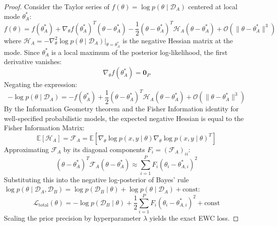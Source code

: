 \documentclass[11pt,a4paper]{article}
\theoremstyle{definition}
\begin{document}
\begin{proof}
Consider the Taylor series of $f(\theta) = \log p(\theta \mid \mathcal{D}_A)$ centered at local mode $\theta_A^*$:
{\boldmath
\begin{equation}
f(\theta) = f(\theta_A^*) + \nabla_\theta f(\theta_A^*)^T (\theta - \theta_A^*) - \frac{1}{2} (\theta - \theta_A^*)^T \mathcal{H}_A (\theta - \theta_A^*) + \mathcal{O}(\|\theta - \theta_A^*\|^3)
\end{equation}
}
where $\mathcal{H}_A = - \nabla_\theta^2 \log p(\theta \mid \mathcal{D}_A)|_{\theta = \theta_A^*}$ is the negative Hessian matrix at the mode.
Since $\theta_A^*$ is a local maximum of the posterior log-likelihood, the first derivative vanishes:
{\boldmath
\begin{equation}
\nabla_\theta f(\theta_A^*) = \mathbf{0}_P
\end{equation}
}
Negating the expression:
{\boldmath
\begin{equation}
-\log p(\theta \mid \mathcal{D}_A) = -f(\theta_A^*) + \frac{1}{2} (\theta - \theta_A^*)^T \mathcal{H}_A (\theta - \theta_A^*) + \mathcal{O}(\|\theta - \theta_A^*\|^3)
\end{equation}
}
By the Information Geometry theorem and the Fisher Information identity for well-specified probabilistic models, the expected negative Hessian is equal to the Fisher Information Matrix:
{\boldmath
\begin{equation}
\mathbb{E}[\mathcal{H}_A] = \mathcal{F}_A = \mathbb{E}\left[ \nabla_\theta \log p(x, y \mid \theta) \nabla_\theta \log p(x, y \mid \theta)^T \right]
\end{equation}
}
Approximating $\mathcal{F}_A$ by its diagonal components $F_i = (\mathcal{F}_A)_{ii}$:
{\boldmath
\begin{equation}
(\theta - \theta_A^*)^T \mathcal{F}_A (\theta - \theta_A^*) \approx \sum_{i=1}^P F_i (\theta_i - \theta_{A, i}^*)^2
\end{equation}
}
Substituting this into the negative log-posterior of Bayes' rule $\log p(\theta \mid \mathcal{D}_A, \mathcal{D}_B) = \log p(\mathcal{D}_B \mid \theta) + \log p(\theta \mid \mathcal{D}_A) + \text{const}$:
{\boldmath
\begin{equation}
\mathcal{L}_{\text{total}}(\theta) = -\log p(\mathcal{D}_B \mid \theta) + \frac{1}{2} \sum_{i=1}^P F_i (\theta_i - \theta_{A, i}^*)^2 + \text{const}
\end{equation}
}
Scaling the prior precision by hyperparameter $\lambda$ yields the exact EWC loss.
\end{proof}
\end{document}
